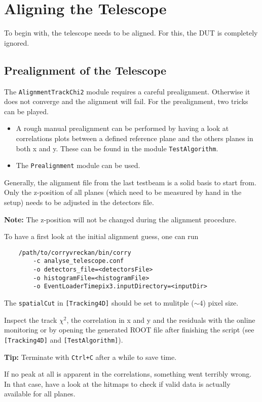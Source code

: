 \section{Aligning the Telescope}
\label{sec:align_tel}
To begin with, the telescope needs to be aligned. 
For this, the DUT is completely ignored.

\subsection*{Prealignment of the Telescope}
The \texttt{AlignmentTrackChi2} module requires a careful prealignment. Otherwise it does not converge and the alignment will fail.
For the prealignment, two tricks can be played.
\begin{itemize}
\item A rough manual prealignment can be performed by having a look at correlations plots between a defined reference plane and the others planes in both x and y.
These can be found in the module \texttt{TestAlgorithm}.
\item The \texttt{Prealignment} module can be used.
\end{itemize}

Generally, the alignment file from the last testbeam is a solid basis to start from. Only the z-position of all planes (which need to be measured by hand in the setup) needs to be adjusted in the detectors file. 

\textbf{Note:} The z-position will not be changed during the alignment procedure.

To have a first look at the initial alignment guess, one can run
\begin{verbatim}
    /path/to/corryvreckan/bin/corry 
        -c analyse_telescope.conf
    	-o detectors_file=<detectorsFile> 
    	-o histogramFile=<histogramFile> 
    	-o EventLoaderTimepix3.inputDirectory=<inputDir>
\end{verbatim}

The \texttt{spatialCut} in \texttt{[Tracking4D]} should be set to mulitple ($\sim4$) pixel size.

Inspect the track $\chi^2$, the correlation in x and y and the residuals with the online monitoring or by opening the generated ROOT file after finishing the script (see \texttt{[Tracking4D]} and \texttt{[TestAlgorithm]}).

\textbf{Tip:} Terminate \corry with \texttt{Ctrl+C} after a while to save time.

If no peak at all is apparent in the correlations, something went terribly wrong.
In that case, have a look at the hitmaps to check if valid data is actually available for all planes.

